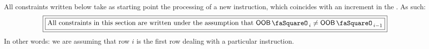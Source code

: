 All constraints written below take as starting point the processing of a new instruction, which coincides with an increment in the \oobStamp{}. As such:
\[
	\boxed{\boxed{\text{All constraints in this section are written under the assumption that } \oobStamp_{i} \neq \oobStamp_{i - 1}}}
\]
In other words: we are assuming that row $i$ is the first row dealing with a particular instruction.
